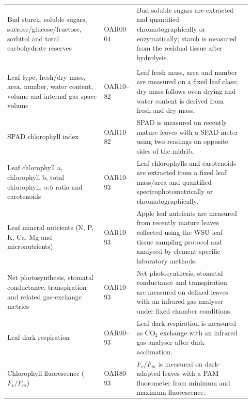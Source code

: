 \begin{landscape}
\begin{longtable}{>{\RaggedRight\arraybackslash}p{5.1cm} >{\RaggedRight\arraybackslash}p{2.3cm} >{\RaggedRight\arraybackslash}p{16.7cm} >{\RaggedRight\arraybackslash}p{2.4cm}}
Bud starch, soluble sugars, sucrose/glucose/fructose, sorbitol and total carbohydrate reserves &
OAR00--04 &
Bud soluble sugars are extracted and quantified chromatographically or enzymatically; starch is measured from the residual tissue after hydrolysis. &
\citep{sapkota2021,raese1977,sydney_anthrone}\\

\multicolumn{4}{l}{\textbf{Leaf morphology, physiology and nutrients}}\\
Leaf type, fresh/dry mass, area, number, water content, volume and internal gas-space volume &
OAR10--82 &
Leaf fresh mass, area and number are measured on a fixed leaf class; dry mass follows oven drying and water content is derived from fresh and dry mass. &
\citep{schechter1992,lakso1984}\\

SPAD chlorophyll index &
OAR10--82 &
SPAD is measured on recently mature leaves with a SPAD meter using two readings on opposite sides of the midrib. &
\citep{neilsen1995}\\

Leaf chlorophyll a, chlorophyll b, total chlorophyll, a:b ratio and carotenoids &
OAR10--93 &
Leaf chlorophylls and carotenoids are extracted from a fixed leaf mass/area and quantified spectrophotometrically or chromatographically. &
\citep{lauzike2020,tartachnyk2004}\\

Leaf mineral nutrients (N, P, K, Ca, Mg and micronutrients) &
OAR10--93 &
Apple leaf nutrients are measured from recently mature leaves collected using the WSU leaf-tissue sampling protocol and analysed by element-specific laboratory methods. &
\citep{wsu_leaf_tissue}\\

Net photosynthesis, stomatal conductance, transpiration and related gas-exchange metrics &
OAR10--93 &
Net photosynthesis, stomatal conductance and transpiration are measured on defined leaves with an infrared gas analyser under fixed chamber conditions. &
\citep{wunsche1996,lauzike2020}\\

Leaf dark respiration &
OAR90--93 &
Leaf dark respiration is measured as CO$_2$ exchange with an infrared gas analyser after dark acclimation. &
\citep{barden1979}\\

Chlorophyll fluorescence ($F_v/F_m$) &
OAR80--93 &
$F_v/F_m$ is measured on dark-adapted leaves with a PAM fluorometer from minimum and maximum fluorescence. &
\citep{tartachnyk2004}\\


\end{longtable}
\end{landscape}
